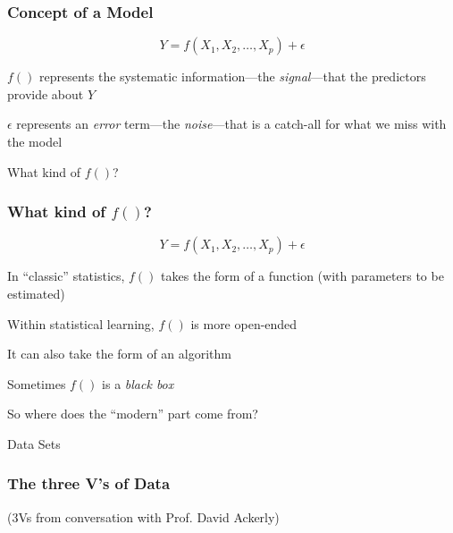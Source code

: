 \documentclass[12pt]{beamer}\usepackage[]{graphicx}\usepackage[]{color}
\begin{document}
\begin{frame}
\frametitle{Concept of a Model}

{\large
$$
Y = f(X_1, X_2, \dots, X_p) + \epsilon
$$
}

\bbi
  \item $f()$ represents the systematic information---the {\mdlit \textit{signal}}---that 
  the predictors provide about $Y$
  \item $\epsilon$ represents an \textit{error} term---the {\mdlit \textit{noise}}---that 
  is a catch-all for what we miss with the model
\ei

\begin{center}
{\lit What kind of $f()$?}
\end{center}

\end{frame}


\begin{frame}
\frametitle{What kind of $f()$?}

$$
Y = f(X_1, X_2, \dots, X_p) + \epsilon
$$

\bbi
  \item In ``classic'' statistics, $f()$ takes the form of a function 
  {\lolit (with parameters to be estimated)}
  \item Within statistical learning, $f()$ is more open-ended
  \item It can also take the form of an algorithm
  \item Sometimes $f()$ is a \textit{black box}
\ei

\end{frame}


\begin{frame}
\begin{center}
{\lolit So where does the ``modern'' part come from?}

\Large{\mdlit Data Sets}
\end{center}
\end{frame}


\begin{frame}
\frametitle{The three V's of Data}
\begin{center}

{\footnotesize {\lolit (3Vs from conversation with Prof. David Ackerly)}}
\end{center}
\end{frame}
\end{document}
